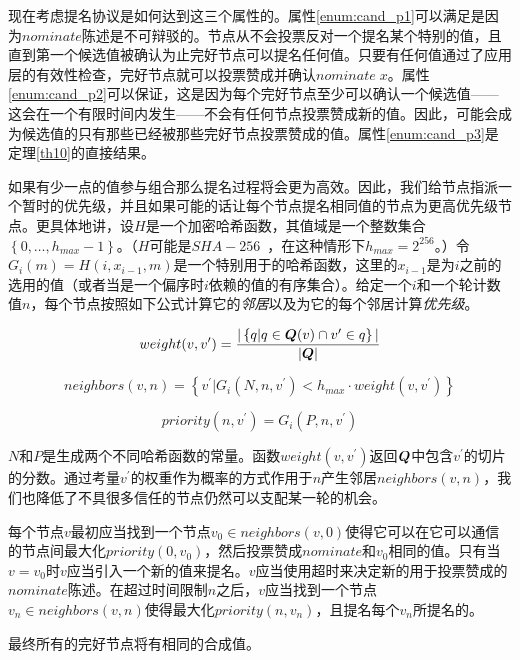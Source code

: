 现在考虑提名协议是如何达到这三个属性的。属性\ref{enum:cand_p1}可以满足是因为$nominate$陈述是不可辩驳的。节点从不会投票反对一个提名某个特别的值，且直到第一个候选值被确认为止完好节点可以提名任何值。只要有任何值通过了应用层的有效性检查，完好节点就可以投票赞成并确认$nominate\;x$。属性\ref{enum:cand_p2}可以保证，这是因为每个完好节点至少可以确认一个候选值——这会在一个有限时间内发生——不会有任何节点投票赞成新的值。因此，可能会成为候选值的只有那些已经被那些完好节点投票赞成的值。属性\ref{enum:cand_p3}是定理\ref{th10}的直接结果。

如果有少一点的值参与组合那么提名过程将会更为高效。因此，我们给节点指派一个暂时的优先级，并且如果可能的话让每个节点提名相同值的节点为更高优先级节点。更具体地讲，设$H$是一个加密哈希函数，其值域是一个整数集合$\left\{0,\dots,h_{max}-1\right\}$。（$H$可能是$SHA-256$~\cite{shs2015}，在这种情形下$h_{max}=2^{256}$。）令$G_i(m)=H(i, x_{i-1},m)$是一个特别用于{\slot}的哈希函数，这里的$x_{i-1}$是为$i$之前的{\slot}选用的值（或者当{\slot}是一个偏序时{\slot}$i$依赖的值的有序集合）。给定一个{\slot}$i$和一个轮计数值$n$，每个节点按照如下公式计算它的\textit{邻居}以及为它的每个邻居计算\textit{优先级}。

\begin{equation*}
	weight(v,v^{\prime}) = \frac{|\left\{q|q\in{\bm Q}(v)\cap v^{\prime}\in q\right\}|}{|{\bm Q}|}
\end{equation*}

\begin{equation*}
	neighbors(v,n) = \left\{v^{\prime}|G_i(N,n,v^{\prime})<h_{max}\cdot weight(v,v^{\prime})\right\}
\end{equation*}

\begin{equation*}
	priority(n,v^{\prime}) = G_i(P,n,v^{\prime})
\end{equation*}

$N$和$P$是生成两个不同哈希函数的常量。函数$weight(v,v^{\prime})$返回${\bm Q}$中包含$v^{\prime}$的切片的分数。通过考量$v^{\prime}$的权重作为概率的方式作用于$n$产生邻居$neighbors(v,n)$，我们也降低了不具很多信任的节点仍然可以支配某一轮的机会。

每个节点$v$最初应当找到一个节点$v_0\in neighbors(v,0)$使得它可以在它可以通信的节点间最大化$priority(0,v_0)$，然后投票赞成$nominate$和$v_0$相同的值。只有当$v=v_0$时$v$应当引入一个新的值来提名。$v$应当使用超时来决定新的用于投票赞成的$nominate$陈述。在超过时间限制$n$之后，$v$应当找到一个节点$v_n\in neighbors(v,n)$使得最大化$priority(n,v_n)$，且提名每个$v_n$所提名的。

\begin{theorem}\label{th11}
	最终所有的完好节点将有相同的合成值。
\end{theorem}

